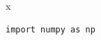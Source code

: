 \documentclass[aspectratio=169,11pt,t]{beamer}
\begin{document}
\begin{frame}[fragile]{x}
\begin{lstlisting}[style=probe]
import numpy as np
\end{lstlisting}
\end{frame}
\end{document}
